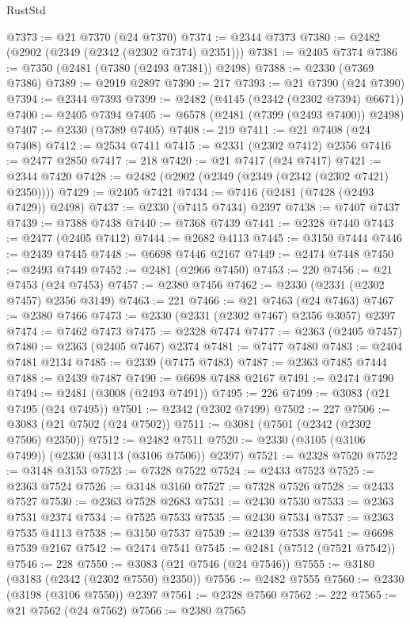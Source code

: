 \begin{lexlean}{RustStd}
\begin{coremodule}
@7373 := @21 @7370 (@24 @7370)
@7374 := @2344 @7373
@7380 := @2482 (@2902 (@2349 (@2342 (@2302 @7374) @2351)))
@7381 := @2405 @7374
@7386 := @7350 (@2481 (@7380 (@2493 @7381)) @2498)
@7388 := @2330 (@7369 @7386)
@7389 := @2919 @2897
@7390 := 217
@7393 := @21 @7390 (@24 @7390)
@7394 := @2344 @7393
@7399 := @2482 (@4145 (@2342 (@2302 @7394) @6671))
@7400 := @2405 @7394
@7405 := @6578 (@2481 (@7399 (@2493 @7400)) @2498)
@7407 := @2330 (@7389 @7405)
@7408 := 219
@7411 := @21 @7408 (@24 @7408)
@7412 := @2534 @7411
@7415 := @2331 (@2302 @7412) @2356
@7416 := @2477 @2850
@7417 := 218
@7420 := @21 @7417 (@24 @7417)
@7421 := @2344 @7420
@7428 := @2482 (@2902 (@2349 (@2349 (@2342 (@2302 @7421) @2350))))
@7429 := @2405 @7421
@7434 := @7416 (@2481 (@7428 (@2493 @7429)) @2498)
@7437 := @2330 (@7415 @7434) @2397
@7438 := @7407 @7437
@7439 := @7388 @7438
@7440 := @7368 @7439
@7441 := @2328 @7440
@7443 := @2477 (@2405 @7412)
@7444 := @2682 @4113
@7445 := @3150 @7444
@7446 := @2439 @7445
@7448 := @6698 @7446 @2167
@7449 := @2474 @7448
@7450 := @2493 @7449
@7452 := @2481 (@2966 @7450)
@7453 := 220
@7456 := @21 @7453 (@24 @7453)
@7457 := @2380 @7456
@7462 := @2330 (@2331 (@2302 @7457) @2356 @3149)
@7463 := 221
@7466 := @21 @7463 (@24 @7463)
@7467 := @2380 @7466
@7473 := @2330 (@2331 (@2302 @7467) @2356 @3057) @2397
@7474 := @7462 @7473
@7475 := @2328 @7474
@7477 := @2363 (@2405 @7457)
@7480 := @2363 (@2405 @7467) @2374
@7481 := @7477 @7480
@7483 := @2404 @7481 @2134
@7485 := @2339 (@7475 @7483)
@7487 := @2363 @7485 @7444
@7488 := @2439 @7487
@7490 := @6698 @7488 @2167
@7491 := @2474 @7490
@7494 := @2481 (@3008 (@2493 @7491))
@7495 := 226
@7499 := @3083 (@21 @7495 (@24 @7495))
@7501 := @2342 (@2302 @7499)
@7502 := 227
@7506 := @3083 (@21 @7502 (@24 @7502))
@7511 := @3081 (@7501 (@2342 (@2302 @7506) @2350))
@7512 := @2482 @7511
@7520 := @2330 (@3105 (@3106 @7499)) (@2330 (@3113 (@3106 @7506)) @2397)
@7521 := @2328 @7520
@7522 := @3148 @3153
@7523 := @7328 @7522
@7524 := @2433 @7523
@7525 := @2363 @7524
@7526 := @3148 @3160
@7527 := @7328 @7526
@7528 := @2433 @7527
@7530 := @2363 @7528 @2683
@7531 := @2430 @7530
@7533 := @2363 @7531 @2374
@7534 := @7525 @7533
@7535 := @2430 @7534
@7537 := @2363 @7535 @4113
@7538 := @3150 @7537
@7539 := @2439 @7538
@7541 := @6698 @7539 @2167
@7542 := @2474 @7541
@7545 := @2481 (@7512 (@7521 @7542))
@7546 := 228
@7550 := @3083 (@21 @7546 (@24 @7546))
@7555 := @3180 (@3183 (@2342 (@2302 @7550) @2350))
@7556 := @2482 @7555
@7560 := @2330 (@3198 (@3106 @7550)) @2397
@7561 := @2328 @7560
@7562 := 222
@7565 := @21 @7562 (@24 @7562)
@7566 := @2380 @7565

\end{coremodule}
\end{lexlean}
